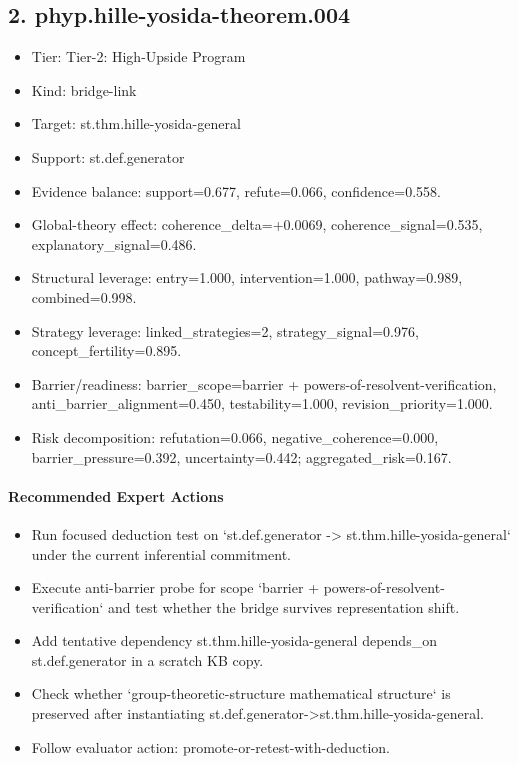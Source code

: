 \documentclass[11pt]{article}
\begin{document}
\subsection*{2. phyp.hille-yosida-theorem.004}
\begin{itemize}
\item Tier: Tier-2: High-Upside Program
\item Kind: bridge-link
\item Target: st.thm.hille-yosida-general
\item Support: st.def.generator
\item Evidence balance: support=0.677, refute=0.066, confidence=0.558.
\item Global-theory effect: coherence\_delta=+0.0069, coherence\_signal=0.535, explanatory\_signal=0.486.
\item Structural leverage: entry=1.000, intervention=1.000, pathway=0.989, combined=0.998.
\item Strategy leverage: linked\_strategies=2, strategy\_signal=0.976, concept\_fertility=0.895.
\item Barrier/readiness: barrier\_scope=barrier + powers-of-resolvent-verification, anti\_barrier\_alignment=0.450, testability=1.000, revision\_priority=1.000.
\item Risk decomposition: refutation=0.066, negative\_coherence=0.000, barrier\_pressure=0.392, uncertainty=0.442; aggregated\_risk=0.167.
\end{itemize}
\paragraph{Recommended Expert Actions}
\begin{itemize}
\item Run focused deduction test on `st.def.generator -> st.thm.hille-yosida-general` under the current inferential commitment.
\item Execute anti-barrier probe for scope `barrier + powers-of-resolvent-verification` and test whether the bridge survives representation shift.
\item Add tentative dependency st.thm.hille-yosida-general depends\_on st.def.generator in a scratch KB copy.
\item Check whether `group-theoretic-structure mathematical structure` is preserved after instantiating st.def.generator->st.thm.hille-yosida-general.
\item Follow evaluator action: promote-or-retest-with-deduction.
\end{itemize}
\end{document}
